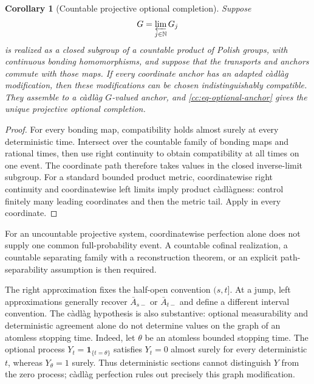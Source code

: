 \documentclass[10pt,reqno]{amsart}
\theoremstyle{plain}
\newtheorem{corollary}[theorem]{Corollary}
\theoremstyle{definition}
\theoremstyle{remark}
\begin{document}
\begin{corollary}[Countable projective optional completion]
\label{cc:cor-projective-optional-completion}
Suppose
\[
 G=\varprojlim_{j\in\mathbb N}G_j
\]
is realized as a closed subgroup of a countable product of Polish groups,
with continuous bonding homomorphisms, and suppose that the transports and
anchors commute with those maps.  If every coordinate anchor has an adapted
càdlàg modification, then these modifications can be chosen
indistinguishably compatible.  They assemble to a càdlàg \(G\)-valued
anchor, and \eqref{cc:eq-optional-anchor} gives the unique projective
optional completion.
\end{corollary}

\begin{proof}
For every bonding map, compatibility holds almost surely at every
deterministic time.  Intersect over the countable family of bonding maps
and rational times, then use right continuity to obtain compatibility at
all times on one event.  The coordinate path therefore takes values in the
closed inverse-limit subgroup.  For a standard bounded product metric,
coordinatewise right continuity and coordinatewise left limits imply
product càdlàgness: control finitely many leading coordinates and then the
metric tail.  Apply  in every coordinate.
\end{proof}

For an uncountable projective system, coordinatewise perfection alone does
not supply one common full-probability event.  A countable cofinal
realization, a countable separating family with a reconstruction theorem,
or an explicit path-separability assumption is then required.

The right approximation fixes the half-open convention \((s,t]\).  At a
jump, left approximations generally recover \(\bar A_{s-}\) or
\(\bar A_{t-}\) and define a different interval convention.  The càdlàg
hypothesis is also substantive: optional measurability and deterministic
agreement alone do not determine values on the graph of an atomless
stopping time.  Indeed, let \(\theta\) be an atomless bounded stopping time.
The optional process \(Y_t={\mathbf 1}_{\{t=\theta\}}\) satisfies
\(Y_t=0\) almost surely for every deterministic \(t\), whereas
\(Y_\theta=1\) surely.  Thus deterministic sections cannot distinguish
\(Y\) from the zero process; càdlàg perfection rules out precisely this
graph modification.
\end{document}
